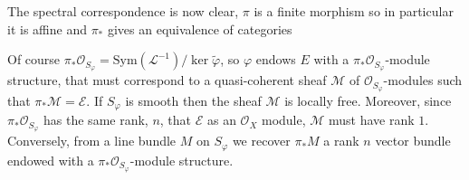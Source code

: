 \documentclass[12pt,a4paper]{book}
\theoremstyle{definition} \newtheorem{defn}[thm]{Definition}
\theoremstyle{definition} \newtheorem{ejemplo}[thm]{Example}
\theoremstyle{remark} \newtheorem{rem}[thm]{Remark}
\def\OO{\mathscr{O}}
\def\LL{\mathscr{L}}
\def\MM{\mathscr{M}}
\def\EE{\mathscr{E}}
\def\Sym{\mathrm{Sym}}
\begin{document}
      The spectral correspondence is now clear, $\pi$ is a finite morphism so in particular it is affine and $\pi_*$ gives an equivalence of categories
  \begin{center}
  \end{center}
  Of course $\pi_*\OO_{S_\varphi}=\Sym(\LL^{-1})/\ker \tilde{\varphi}$, so $\varphi$ endows $E$ with a $\pi_*\OO_{S_\varphi}$-module structure, that must correspond to a quasi-coherent sheaf $\MM$ of $\OO_{S_\varphi}$-modules such that $\pi_* \MM=\EE$. If $S_\varphi$ is smooth then the sheaf $\MM$ is locally free. Moreover, since  $\pi_*\OO_{S_\varphi}$ has the same rank, $n$, that $\EE$ as an $\OO_X$ module, $\MM$ must have rank $1$. Conversely, from a line bundle $M$ on $S_\varphi$ we recover $\pi_*M$ a rank $n$ vector bundle endowed with a $\pi_*\OO_{S_\varphi}$-module structure. 
\end{document}
